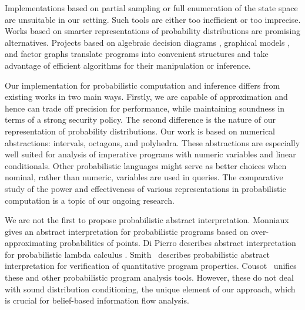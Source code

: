 Implementations based on partial sampling \cite{goodman08church,
  park08sampling} or full enumeration \cite{radul07probscheme} of the
state space are unsuitable in our setting. Such tools are either too
inefficient or too imprecise. Works based on smarter representations
of probability distributions are promising alternatives. Projects
based on algebraic decision diagrams \cite{claret12bayesian},
graphical models \cite{milch05blog}, and factor graphs
\cite{borgstrom11measure, pfeffer07ibal} translate programs into
convenient structures and take advantage of efficient algorithms for
their manipulation or inference.

Our implementation for probabilistic computation and inference differs
from existing works in two main ways. Firstly, we are capable of
approximation and hence can trade off precision for performance, while
maintaining soundness in terms of a strong security policy. The second
difference is the nature of our representation of probability
distributions. Our work is based on numerical abstractions: intervals,
octagons, and polyhedra. These abstractions are especially well suited
for analysis of imperative programs with numeric variables and linear
conditionals. Other probabilistic languages
might serve as better choices when nominal, rather than numeric,
variables are used in queries. The comparative study of the power and effectiveness
of various representations in probabilistic computation is a topic of
our ongoing research.

We are not the first to propose probabilistic abstract
interpretation. Monniaux~\cite{Monniaux_these} gives an abstract
interpretation for probabilistic programs based on over-approximating
probabilities of points. Di Pierro describes abstract interpretation
for probabilistic lambda calculus
\cite{dipierro05probabilistic}. Smith~\cite{smith08probabilistic}
describes probabilistic abstract interpretation for verification of
quantitative program properties. Cousot~\cite{cousot12probabilistic}
unifies these and other probabilistic program analysis tools. However,
these do not deal with sound distribution conditioning, the unique
element of our approach, which is crucial for belief-based information
flow analysis.



